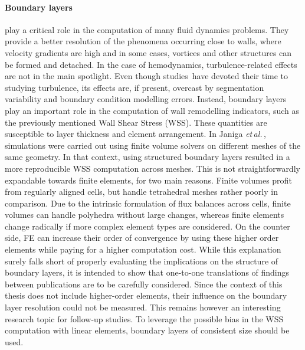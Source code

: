 \paragraph{Boundary layers} play a critical role in the computation of many fluid dynamics problems. They provide a better resolution of the phenomena occurring close to walls, where velocity gradients are high and in some cases, vortices and other structures can be formed and detached. In the case of hemodynamics, turbulence-related effects are not in the main spotlight. Even though studies\,\cite{Valen-Sendstad2011,Jain2016} have devoted their time to studying turbulence, its effects are, if present, overcast by segmentation variability and boundary condition modelling errors. Instead, boundary layers play an important role in the computation of wall remodelling indicators, such as the previously mentioned Wall Shear Stress (WSS)\@. These quantities are susceptible to layer thickness and element arrangement. In Janiga \textit{et\,al.}\,\cite{Janiga2013_mesh}, simulations were carried out using finite volume solvers on different meshes of the same geometry. In that context, using structured boundary layers resulted in a more reproducible WSS computation across meshes. This is not straightforwardly expandable towards finite elements, for two main reasons. Finite volumes profit from regularly aligned cells, but handle tetrahedral meshes rather poorly in comparison. Due to the intrinsic formulation of flux balances across cells, finite volumes can handle polyhedra without large changes, whereas finite elements change radically if more complex element types are considered. On the counter side, FE can increase their order of convergence by using these higher order elements while paying for a higher computation cost. While this explanation surely falls short of properly evaluating the implications on the structure of boundary layers, it is intended to show that one-to-one translations of findings between publications are to be carefully considered. Since the context of this thesis does not include higher-order elements, their influence on the boundary layer resolution could not be measured. This remains however an interesting research topic for follow-up studies. To leverage the possible bias in the WSS computation with linear elements, boundary layers of consistent size should be used.

